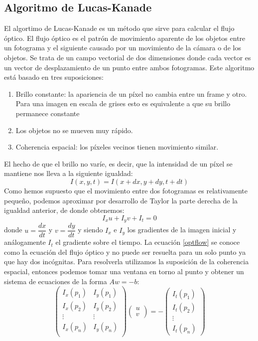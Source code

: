 \documentclass[a4paper,openright, 12pt]{book}
\begin{document}
\newpage
\subsection{Algoritmo de Lucas-Kanade}
El algortimo de Lucas-Kanade \cite{LucasKanade} es un método que sirve para calcular el flujo óptico.
El flujo óptico es el patrón de movimiento aparente de los objetos entre un fotograma y el siguiente causado por un movimiento de la cámara o de los objetos. Se trata de un campo vectorial de dos dimensiones donde cada vector es un vector de desplazamiento de un punto entre ambos fotogramas.
Este algoritmo está basado en tres suposiciones:
\begin{enumerate}
\item Brillo constante: la apariencia de un píxel no cambia entre un frame y otro. Para una imagen en escala de grises esto es equivalente a que su brillo permanece constante
\item Los objetos no se mueven muy rápido.
\item Coherencia espacial: los píxeles vecinos tienen movimiento similar.
\end{enumerate}
El hecho de que el brillo no varíe, es decir, que la intensidad de un píxel se mantiene nos lleva a la siguiente igualdad:
\begin{equation}
I(x,y,t)=I(x+dx,y+dy,t+dt)
\end{equation}
Como hemos supuesto que el movimiento entre dos fotogramas es relativamente pequeño, podemos aproximar por desarrollo de Taylor la parte derecha de la igualdad anterior, de donde obtenemos:
\begin{equation}
\label{optflow}
I_x u + I_y v + I_t = 0
\end{equation}
 donde $u= \dfrac{dx}{dt}$ y $v= \dfrac{dy}{dt}$ y siendo $I_x$ e $I_y$ los gradientes de la imagen inicial y análogamente $I_t$ el gradiente sobre el tiempo.
La ecuación \ref{optflow} se conoce como la ecuación del flujo óptico y no puede ser resuelta para un solo punto ya que hay dos incógnitas.
Para resolverla utilizamos la suposición de la coherencia espacial, entonces podemos tomar una ventana en torno al punto y obtener un sistema de ecuaciones de la forma $Aw=-b$:
\begin{equation}
\left(
\begin{matrix}
I_x(p_1) & I_y(p_1)\\
I_x(p_2) & I_y(p_2)\\
\vdots & \vdots \\
I_x(p_n) & I_y(p_n)\\
\end{matrix}
\right)
\left(\begin{array}{c}u\\v\end{array}\right)
=
- \left(\begin{array}{c} I_t(p_1)\\I_t(p_2)\\ \vdots\\ I_t(p_n)\end{array}\right)
\end{equation}
\end{document}
